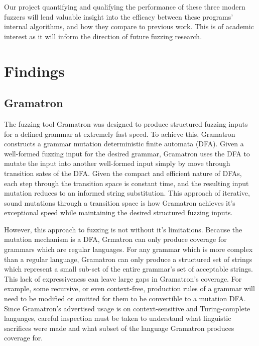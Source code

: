 \documentclass[12pt]{diazessay}
\begin{document}
Our project quantifying and qualifying the performance of these three modern fuzzers will lend valuable insight into the efficacy between these programs' internal algorithms, and how they compare to previous work.
This is of academic interest as it will inform the direction of future fuzzing research.


\vspace{4mm}
\section*{Findings}
\label{results}

\subsection*{Gramatron}

The fuzzing tool Gramatron was designed to produce structured fuzzing inputs for a defined grammar at extremely fast speed.
To achieve this, Gramatron constructs a grammar mutation deterministic finite automata (DFA).
Given a well-formed fuzzing input for the desired grammar, Gramatron uses the DFA to mutate the input into another well-formed input simply by move through transition sates of the DFA.
Given the compact and efficient nature of DFAs, each step through the transition space is constant time, and the resulting input mutation reduces to an informed string substitution.
This approach of iterative, sound mutations through a transition space is how Gramatron achieves it's exceptional speed while maintaining the desired structured fuzzing inputs.

However, this approach to fuzzing is not without it's limitations.
Because the mutation mechanism is a DFA, Grmatron can only produce coverage for grammars which are regular languages.
For any grammar which is more complex than a regular language, Gramatron can only produce a structured set of strings which represent a small sub-set of the entire grammar's set of acceptable strings.
This lack of expressiveness can leave large gaps in Gramatron's coverage.
For example, some recursive, or even context-free, production rules of a grammar will need to be modified or omitted for them to be convertible to a mutation DFA.
Since Gramatron's advertised usage is on context-sensitive and Turing-complete languages, careful inspection must be taken to understand what linguistic sacrifices were made and what subset of the language Gramatron produces coverage for.
\end{document}
